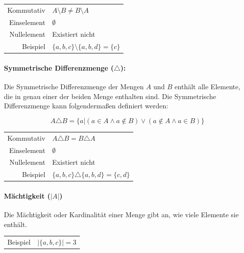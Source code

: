 \documentclass[../main.tex]{subfiles}
\begin{document}
                    \begin{tabular}{ r l }
        	    	    	Kommutativ & $A \setminus B \not = B \setminus A$ \\
        	    	    	Einselement & $\emptyset$ \\
        	    	    	Nullelement & Existiert nicht \\
                        Beispiel & $\{a, b, c\} \setminus \{a, b, d\} = \{c\}$
    	    	    \end{tabular}
                    
                \paragraph{Symmetrische Differenzmenge ($\triangle$):}
                    Die Symmetrische Differenzmenge der Mengen $A$ und $B$ enthält alle Elemente, die in genau einer der beiden Menge enthalten sind. Die Symmetrische Differenzmenge kann folgendermaßen definiert werden:
                    
                    \begin{equation}
                        A \triangle B = \{a | \left(a \in A \wedge a \notin B\right) \vee \left(a \notin A \wedge a \in B\right)\}
                    \end{equation}
                    
                    \begin{tabular}{ r l }
        	    	    	Kommutativ & $A \triangle B = B \triangle A$ \\
        	    	    	Einselement & $\emptyset$ \\
        	    	    	Nullelement & Existiert nicht \\
                        Beispiel & $\{a, b, c\} \triangle \{a, b, d\} = \{c, d\}$
    	    	    \end{tabular}
                    
                \paragraph{Mächtigkeit ($|A|$)}
                    Die Mächtigkeit oder Kardinalität einer Menge gibt an, wie viele Elemente sie enthält.
                    
                    \begin{tabular}{ r l }
                        Beispiel & $|\{a, b, c\}| = 3$
    	    	    \end{tabular}
                    
\end{document}
